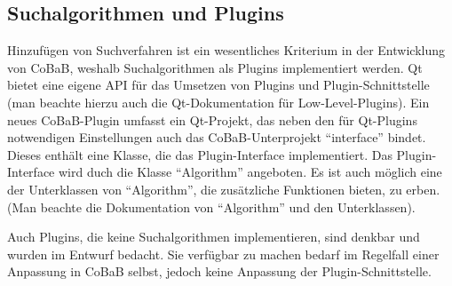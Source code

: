 \subsection{Suchalgorithmen und Plugins}
Hinzufügen von Suchverfahren ist ein wesentliches Kriterium in der Entwicklung von CoBaB, weshalb Suchalgorithmen als Plugins implementiert werden. Qt bietet eine eigene API für das Umsetzen von Plugins und Plugin-Schnittstelle (man beachte hierzu auch die Qt-Dokumentation für Low-Level-Plugins). Ein neues CoBaB-Plugin umfasst ein Qt-Projekt, das neben den für Qt-Plugins notwendigen Einstellungen auch das CoBaB-Unterprojekt \enquote{interface} bindet. Dieses enthält eine Klasse, die das Plugin-Interface implementiert. Das Plugin-Interface wird duch die Klasse \enquote{Algorithm} angeboten. Es ist auch möglich eine der Unterklassen von \enquote{Algorithm}, die zusätzliche Funktionen bieten, zu erben. (Man beachte die Dokumentation von \enquote{Algorithm} und den Unterklassen).

Auch Plugins, die keine Suchalgorithmen implementieren, sind denkbar und wurden im Entwurf bedacht. Sie verfügbar zu machen bedarf im Regelfall einer Anpassung in CoBaB selbst, jedoch keine Anpassung der Plugin-Schnittstelle.
